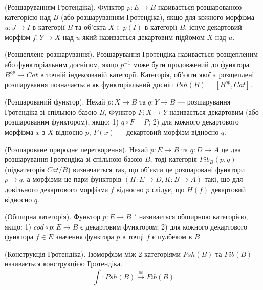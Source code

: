 \begin{definition} (Розшаруванням Гротендіка). Функтор $p : E \rightarrow B$ називається
розшарованою категорією над $B$ (або розшаруванням Гротендіка), якщо
для кожного морфізма $u : J \rightarrow I$ в категорії $B$ та об'єкта $X \in p(I)$ в категорії $B$,
існує декартовий морфізм $f : Y \rightarrow X$ над $u$ який називається декартовим підйомом $X$ над $u$.
\end{definition}

\begin{definition} (Розщеплене розшарування). Розшарування Гротендіка називається
розщепленим або функторіальним досніпом, якщо $p^{-1}$ може бути продовжений до
функтора $B^{op}\rightarrow Cat$ в точній індексованій категорії.
Категорія, об'єкти якої є розщеплені розшарування позначається як функторіальний досніп $Psh(B) = [B^{op},Cat]$.
\end{definition}

\begin{definition} (Розшарований функтор).
Нехай $p : X \rightarrow B$ та $q : Y \rightarrow B$ --- розшарування Гротендіка зі спільною базою $B$,
Функтор $F : X \rightarrow Y$ називається декартовим (або розшарованим функтором), якщо:
1) $q\circ F  = P$;
2) для кожного декартового морфізма $x$ з $X$ відносно $p$, $F(x)$ --- декартовий морфізм відносно $q$.
\end{definition}

\begin{definition} (Розшароване природнє перетворення).
Нехай $p : E \rightarrow B$ та $q : D \rightarrow A$ це два розшарування Гротендіка зі спільною базою $B$,
тоді категорія $Fib_B(p,q)$ (підкатегорія $Cat/B$) визначається так, що об'єкти це розшаровані функтори $p \rightarrow q$, а морфізми це пари функторів
$(H : E \rightarrow D, K : B \rightarrow A)$ такі, що для довільного декартового морфізма $f$ відносно $p$ слідує, що $H(f)$ декартовий відносно $q$.
\end{definition}

\begin{definition} (Обширна категорія). Функтор $p : E \rightarrow B^\rightarrow$ називається обширною категорією, якщо:
1) $cod \circ p : E \rightarrow B$ є декартовим функтором;
2) для кожного декартового функтора $f \in E$ значення функтора $p$ в точці $f$ є пулбеком в $B$.
\end{definition}

\begin{definition} (Конструкція Гротендіка). Ізоморфізм між 2-категоріями $Psh(B)$ та $Fib(B)$
називається конструкцією Гротендіка.
$$
\int : Psh(B) \xrightarrow{\cong} Fib(B)
$$
\end{definition}

